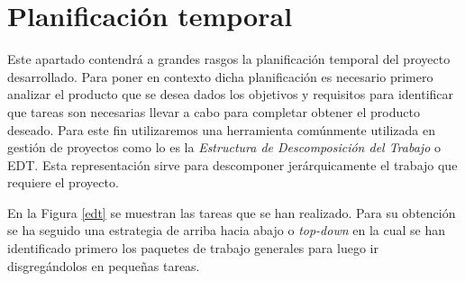 
\section{Planificación temporal}

Este apartado contendrá a grandes rasgos la planificación temporal del proyecto desarrollado. Para poner en contexto dicha planificación es necesario primero analizar el producto que se desea dados los objetivos y requisitos para identificar que tareas son necesarias llevar a cabo para completar obtener el producto deseado. Para este fin utilizaremos una herramienta comúnmente utilizada en gestión de proyectos como lo es la \textit{Estructura de Descomposición del Trabajo} o EDT. Esta representación sirve para descomponer jerárquicamente el trabajo que requiere el proyecto.

\bigskip

En la Figura \ref{edt} se muestran las tareas que se han realizado. Para su obtención se ha seguido una estrategia de arriba hacia abajo o \textit{top-down} en la cual se han identificado primero los paquetes de trabajo generales para luego ir disgregándolos en pequeñas tareas.

\clearpage


